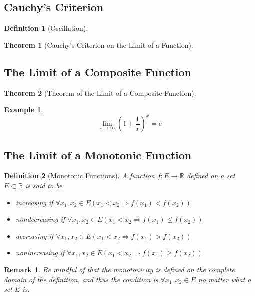 \documentclass[onecolumn]{ctexart}
\newtheorem{definition}{Definition}
\newtheorem{theorem}{Theorem}
\newtheorem{remark}{Remark}
\newtheorem{example}{Example}
\begin{document}
\subsection{Cauchy's Criterion}

\begin{definition}[Oscillation]
  
\end{definition}

\begin{theorem}[Cauchy's Criterion on the Limit of a Function]
  
\end{theorem}

\subsection{The Limit of a Composite Function}

\begin{theorem}[Theorem of the Limit of a Composite Function]
  
\end{theorem}

\begin{example}
  \begin{equation}
    \lim_{x \to \infty} (1 + \frac{1}{x})^x = e
  \end{equation}
\end{example}

\subsection{The Limit of a Monotonic Function}

\begin{definition}[Monotonic Functions]
  A function $f:E \to \mathbb{R}$ defined on a set $E \subset \mathbb{R}$ is 
  said to be
  \begin{itemize}
    \item increasing if $\forall x_1, x_2 \in E (x_1 < x_2 \Rightarrow f(x_1) < f(x_2))$
    \item nondecreasing if $\forall x_1, x_2 \in E (x_1 < x_2 \Rightarrow f(x_1) \leq f(x_2))$
    \item decreasing if $\forall x_1, x_2 \in E (x_1 < x_2 \Rightarrow f(x_1) > f(x_2))$
    \item nonincreasing if $\forall x_1, x_2 \in E (x_1 < x_2 \Rightarrow f(x_1) \geq f(x_2))$
  \end{itemize}
\end{definition}
\begin{remark}
  Be mindful of that the monotonicity is defined on the complete domain of the 
  definition, and thus the condition is $\forall x_1, x_2 \in E$ no matter what 
  a set $E$ is.
\end{remark}
\end{document}
